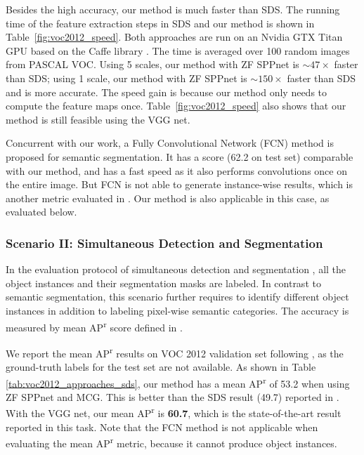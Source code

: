\documentclass[10pt,twocolumn,letterpaper]{article}
\begin{document}
Besides the high accuracy, our method is much faster than SDS. The running time of the feature extraction steps in SDS and our method is shown in Table~\ref{fig:voc2012_speed}. Both approaches are run on an Nvidia GTX Titan GPU based on the Caffe library \cite{jia2014caffe}. The time is averaged over 100 random images from PASCAL VOC. Using 5 scales, our method with ZF SPPnet is $\sim47\times$ faster than SDS; using 1 scale, our method with ZF SPPnet is $\sim$$150\times$ faster than SDS and is more accurate. The speed gain is because our method only needs to compute the feature maps once. Table~\ref{fig:voc2012_speed} also shows that our method is still feasible using the VGG net.

Concurrent with our work, a Fully Convolutional Network (FCN) method \cite{Long2014} is proposed for semantic segmentation. It has a score (62.2 on test set) comparable with our method, and has a fast speed as it also performs convolutions once on the entire image. But FCN is not able to generate instance-wise results, which is another metric evaluated in \cite{hariharan2014simultaneous}. Our method is also applicable in this case, as evaluated below.

\subsubsection*{Scenario II: Simultaneous Detection and Segmentation}

In the evaluation protocol of simultaneous detection and segmentation \cite{hariharan2014simultaneous}, all the object instances and their segmentation masks are labeled. In contrast to semantic segmentation, this scenario further requires to identify different object instances in addition to labeling pixel-wise semantic categories. The accuracy is measured by mean AP\textsuperscript{r} score defined in \cite{hariharan2014simultaneous}.

We report the mean AP\textsuperscript{r} results on VOC 2012 validation set following \cite{hariharan2014simultaneous}, as the ground-truth labels for the test set are not available.
As shown in Table \ref{tab:voc2012_approaches_sds}, our method has a mean AP\textsuperscript{r} of 53.2 when using ZF SPPnet and MCG. This is better than the SDS result (49.7) reported in \cite{hariharan2014simultaneous}. With the VGG net, our mean AP\textsuperscript{r} is \textbf{60.7}, which is the state-of-the-art result reported in this task. Note that the FCN method \cite{Long2014} is not applicable when evaluating the mean AP\textsuperscript{r} metric, because it cannot produce object instances.
\end{document}
